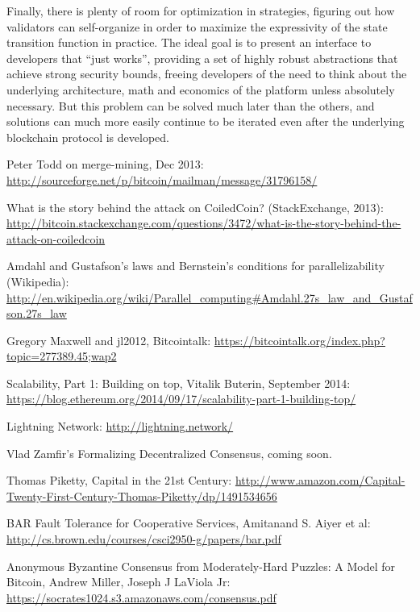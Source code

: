 \documentclass[11pt,a4paper]{report}
\theoremstyle{plain}
\theoremstyle{definition}
\theoremstyle{remark}
\begin{document}
Finally, there is plenty of room for optimization in strategies, figuring out how validators can self-organize in order to maximize the expressivity of the state transition function in practice. The ideal goal is to present an interface to developers that ``just works'', providing a set of highly robust abstractions that achieve strong security bounds, freeing developers of the need to think about the underlying architecture, math and economics of the platform unless absolutely necessary. But this problem can be solved much later than the others, and solutions can much more easily continue to be iterated even after the underlying blockchain protocol is developed.

\begin{thebibliography}{32}

    Peter Todd on merge-mining, Dec 2013: \url{http://sourceforge.net/p/bitcoin/mailman/message/31796158/}

    What is the story behind the attack on CoiledCoin? (StackExchange, 2013): \url{http://bitcoin.stackexchange.com/questions/3472/what-is-the-story-behind-the-attack-on-coiledcoin}

    Amdahl and Gustafson's laws and Bernstein's conditions for parallelizability (Wikipedia): \url{http://en.wikipedia.org/wiki/Parallel_computing#Amdahl.27s_law_and_Gustafson.27s_law}

    Gregory Maxwell and jl2012, Bitcointalk: \url{https://bitcointalk.org/index.php?topic=277389.45;wap2}

    Scalability, Part 1: Building on top, Vitalik Buterin, September 2014: \url{https://blog.ethereum.org/2014/09/17/scalability-part-1-building-top/}

    Lightning Network: \url{http://lightning.network/}

    Vlad Zamfir's Formalizing Decentralized Consensus, coming soon.

    Thomas Piketty, Capital in the 21st Century: \url{http://www.amazon.com/Capital-Twenty-First-Century-Thomas-Piketty/dp/1491534656}

    BAR Fault Tolerance for Cooperative Services, Amitanand S. Aiyer et al: \url{http://cs.brown.edu/courses/csci2950-g/papers/bar.pdf}

    Anonymous Byzantine Consensus from Moderately-Hard Puzzles: A Model for Bitcoin, Andrew Miller, Joseph J LaViola Jr: \url{https://socrates1024.s3.amazonaws.com/consensus.pdf}


\end{thebibliography}
\end{document}
